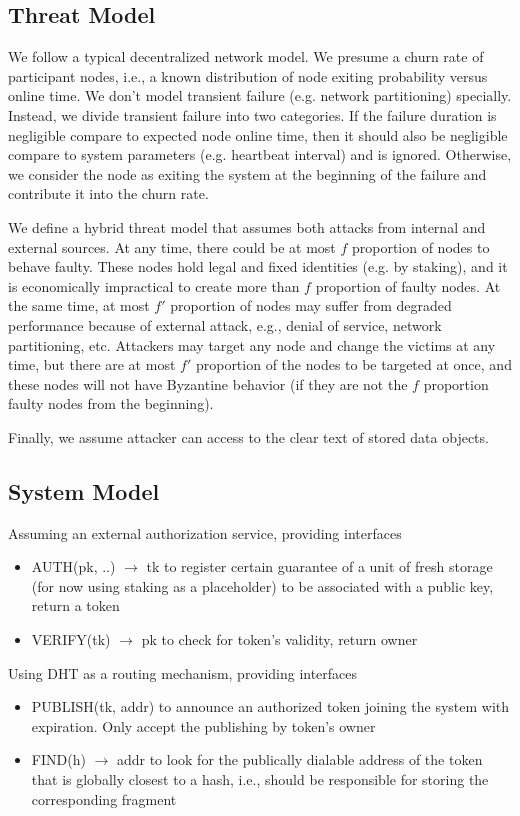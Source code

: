 \subsection{Threat Model}

We follow a typical decentralized network model.
We presume a churn rate of participant nodes, i.e., a known distribution of node exiting probability versus online time.
We don't model transient failure (e.g. network partitioning) specially.
Instead, we divide transient failure into two categories.
If the failure duration is negligible compare to expected node online time, then it should also be negligible compare to
system parameters (e.g. heartbeat interval) and is ignored.
Otherwise, we consider the node as exiting the system at the beginning of the failure and contribute it into the churn
rate.

We define a hybrid threat model that assumes both attacks from internal and external sources.
At any time, there could be at most $f$ proportion of nodes to behave faulty.
These nodes hold legal and fixed identities (e.g. by staking), and it is economically impractical to create more than
$f$ proportion of faulty nodes.
At the same time, at most $f'$ proportion of nodes may suffer from degraded performance because of external attack, 
e.g., denial of service, network partitioning, etc.
Attackers may target any node and change the victims at any time, but there are at most $f'$ proportion of the nodes to 
be targeted at once, and these nodes will not have Byzantine behavior (if they are not the $f$ proportion faulty nodes 
from the beginning).

Finally, we assume attacker can access to the clear text of stored data objects.

\subsection{System Model}
Assuming an external authorization service, providing interfaces 
\begin{itemize}
    \item AUTH(pk, ..) $\rightarrow$ tk to register certain guarantee of a unit of fresh storage (for now using staking 
    as a placeholder) to be associated with a public key, return a token
    \item VERIFY(tk) $\rightarrow$ pk to check for token's validity, return owner
\end{itemize}

Using DHT as a routing mechanism, providing interfaces
\begin{itemize}
    \item PUBLISH(tk, addr) to announce an authorized token joining the system with expiration. Only accept the 
    publishing by token's owner
    \item FIND(h) $\rightarrow$ addr to look for the publically dialable address of the token that is globally closest
    to a hash, i.e., should be responsible for storing the corresponding fragment
\end{itemize}

